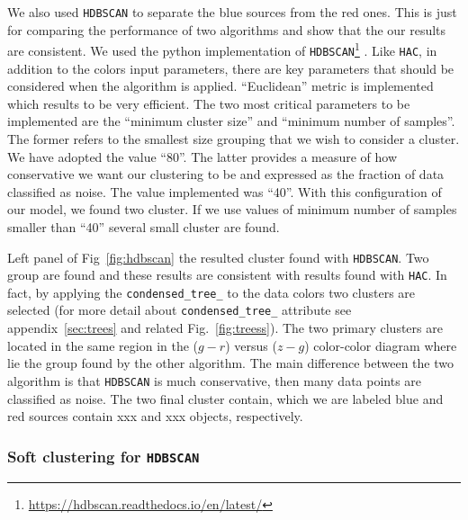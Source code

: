 \documentclass[fleqn,usenatbib]{mnras}
\begin{document}
We also used \texttt{HDBSCAN} to separate the blue sources from the red ones. This is just for
comparing the performance of two algorithms and show that the our results are consistent.
We used the python implementation of \texttt{HDBSCAN}\footnote{\url{https://hdbscan.readthedocs.io/en/latest/}}
\citep{McInnes:2017}. Like \texttt{HAC}, in addition to the colors input
parameters,  there are key parameters that should be considered  when the algorithm is
applied. ``Euclidean'' metric is implemented which results to be very efficient. The two most
critical parameters to be implemented are the ``minimum cluster size'' and ``minimum number
of samples''. The former refers to the smallest size grouping that we wish to consider a cluster.
We have adopted the value ``80''. The latter provides a measure of how conservative we want 
our clustering to be and expressed as the fraction of data classified as noise.
The value implemented was ``40''. With this configuration of our model, we found
two cluster. If we use values of minimum number of samples smaller than ``40'' 
several small cluster are found.

Left panel of Fig~\ref{fig:hdbscan} the resulted cluster found with \texttt{HDBSCAN}. Two group are
found and these results are consistent with results found with  \texttt{HAC}.
In fact, by applying the
\texttt{condensed\_tree\_} to the data colors two clusters are selected (for more detail about
\texttt{condensed\_tree\_} attribute see appendix~\ref{sec:trees} and related
Fig.~\ref{fig:treess}). The two primary clusters are located in the same region in
the ($g - r$) versus ($z - g$) color-color diagram where lie the group found by the other algorithm.
The main difference between the two algorithm is that  \texttt{HDBSCAN}
is much conservative, then many data points are classified as noise. The two final cluster
contain, which we are labeled blue and red sources contain xxx and xxx objects, respectively.

\subsubsection{Soft clustering for \texttt{HDBSCAN}}
\end{document}

